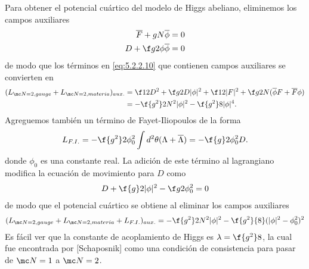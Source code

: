 Para obtener el potencial cuártico del modelo de Higgs abeliano, eliminemos los campos auxiliares
\begin{align}
	\overline F+gN\overline\phi &=0\\
	D+\f g2\phi\overline\phi &=0
\end{align}
de modo que los términos en \eqref{eq:5.2.2.10} que contienen campos auxiliares se convierten en
\begin{align}
	(L_{\mc N=2,gauge}+L_{\mc N=2,materia})_{aux.} &= \f 12D^2+\f g2D|\phi|^2+\f 12|F|^2+\f g2 N(\overline\phi F+\overline F\phi)\\
	&= -\f{g^2}2N^2|\phi|^2-\f{g^2}8|\phi|^4.
\end{align}
Agreguemos también un término de Fayet-Iliopoulos de la forma
\begin{align}
	L_{F.I.} = -\f{g^2}2\phi_0^2\int d^2\theta(\Lambda+\overline\Lambda)=-\f{g}2\phi_0^2 D.
\end{align}
donde $\phi_0$ es una constante real. La adición de este término al lagrangiano modifica la ecuación de movimiento para $D$ como
\begin{align}
	D+\f{g}2|\phi|^2-\f g2\phi_0^2 =0
\end{align}
de modo que el potencial cuártico se obtiene al eliminar los campos auxiliares
\begin{align}
	(L_{\mc N=2,gauge}+L_{\mc N=2,materia}+L_{F.I.})_{aux.} = -\f{g^2}2N^2|\phi|^2-\f{g^2}{8}(|\phi|^2-\phi_0^2)^2
\end{align}
Es fácil ver que la constante de acoplamiento de Higgs es $\lambda=\f{g^2}8$, la cual fue encontrada por [Schaposnik] como una condición de consistencia para pasar de $\mc N=1$ a $\mc N=2$.